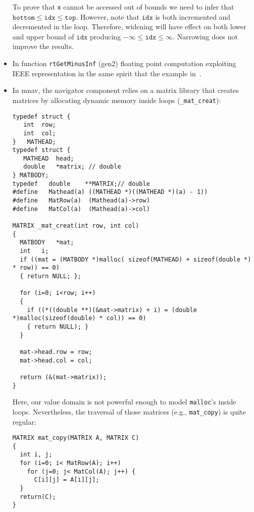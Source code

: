 \documentclass[a4]{article}
\begin{document}
\begin{itemize}
\noindent To prove that \texttt{x} cannot be accessed out of bounds we
need to infer that $\mathtt{bottom} \leq \mathtt{idx} \leq
\mathtt{top}$. However, note that $\mathtt{idx}$ is both incremented
and decremented in the loop. Therefore, widening will have effect on
both lower and upper bound of $\mathtt{idx}$ producing $-\infty \leq
\mathtt{idx} \leq \infty$. Narrowing does not improve the results.


\item In function \texttt{rtGetMinusInf} (\textsf{gen2}) floating
  point computation exploiting IEEE representation in the same spirit
  that the example in~\cite{Mine12}.

\item In \textsf{mnav}, the navigator component relies on a matrix
  library that creates matrices by allocating dynamic memory inside
  loops (\texttt{\_mat\_creat}):

\begin{small}
\begin{verbatim}
typedef struct {
   int	row;
   int	col;
}	MATHEAD;
typedef struct {
   MATHEAD	head;
   double	*matrix; // double
} MATBODY;
typedef   double	**MATRIX;// double
#define   Mathead(a) ((MATHEAD *)((MATHEAD *)(a) - 1))
#define   MatRow(a)	 (Mathead(a)->row)
#define   MatCol(a)	 (Mathead(a)->col)

MATRIX _mat_creat(int row, int col)
{
  MATBODY	*mat;
  int 	i;
  if ((mat = (MATBODY *)malloc( sizeof(MATHEAD) + sizeof(double *) * row)) == 0)
  { return NULL; };
  
  for (i=0; i<row; i++)
  {
    if ((*((double **)(&mat->matrix) + i) = (double *)malloc(sizeof(double) * col)) == 0)
    { return NULL); }
  }
  
  mat->head.row = row;
  mat->head.col = col;
  
  return (&(mat->matrix));
}
\end{verbatim}
\end{small}

\noindent Here, our value domain is not powerful enough to model
\texttt{malloc}'s inside loops. Nevertheless, the traversal of those
matrices (e.g., \texttt{mat\_copy}) is quite regular:

\begin{small}
\begin{verbatim}
MATRIX mat_copy(MATRIX A, MATRIX C)
{
  int i, j;
  for (i=0; i< MatRow(A); i++)
    for (j=0; j< MatCol(A); j++) {
      C[i][j] = A[i][j];
  }
  return(C);
}
\end{verbatim}
\end{small}


\end{itemize}
\end{document}
